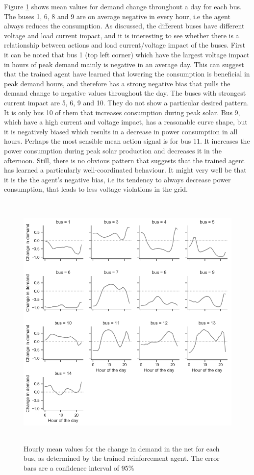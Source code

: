 \documentclass[class=book, crop=false]{standalone}
\begin{document}
Figure \ref{fig:discussion:config1_action_bus} shows mean values for demand change throughout a day for each bus.  The buses 1, 6, 8 and 9 are on average negative in every hour, i.e the agent always reduces the consumption. As discussed, the different buses have different voltage and load current impact, and it is interesting to see whether there is a relationship between actions and load current/voltage impact of the buses. First it can be noted that bus 1 (top left corner) which have the largest voltage impact in hours of peak demand mainly is negative in an average day. This can suggest that the trained agent have learned that lowering the consumption is beneficial in peak demand hours, and therefore has a strong negative bias that pulls the demand change to negative values throughout the day. The buses with strongest current impact are 5, 6, 9 and 10. They do not show a particular desired pattern. It is only bus 10 of them that increases consumption during peak solar. Bus 9, which have a high current and voltage impact, has a reasonable curve shape, but it is negatively biased which results in a decrease in power consumption in all hours. Perhaps the most sensible mean action signal is for bus 11. It increases the power consumption during peak solar production and decreases it in the afternoon. Still, there is no obvious pattern that suggests that the trained agent has learned a particularly well-coordinated behaviour. It might very well be that it is the the agent's negative bias, i.e its tendency to always decrease power consumption, that leads to less voltage violations in the grid.

\begin{figure}[h]
    \center
\includegraphics[height=13cm, width=12cm]{figures/config1_action_bus.png}
    \caption[size = 9]{Hourly mean values for the change in demand in the net for each bus, as determined by the trained reinforcement agent. The error bars are a confidence interval of 95\%}
    \label{fig:discussion:config1_action_bus}
\end{figure}
\end{document}
